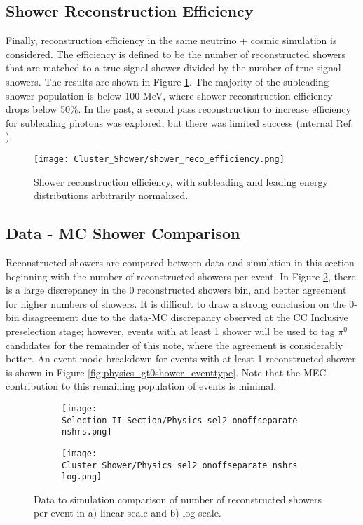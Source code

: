 \clearpage
\subsection{Shower Reconstruction Efficiency}
Finally, reconstruction efficiency in the same neutrino + cosmic simulation is considered.  The efficiency is defined to be the number of reconstructed showers that are matched to a true signal shower divided by the number of true signal showers. The results are shown in Figure \ref{fig:shower_reco_efficiency}.  The majority of the subleading shower population is below 100 MeV, where shower reconstruction efficiency drops below 50\%.  In the past, a second pass reconstruction to increase efficiency for subleading photons was explored, but there was limited success (internal Ref. \cite{bib:jz_catch_subleading}).  

\begin{figure}[h!]
\centering
\texttt{[image: Cluster\_Shower/shower\_reco\_efficiency.png]}
\caption{Shower reconstruction efficiency, with subleading and leading energy distributions arbitrarily normalized.  }
\label{fig:shower_reco_efficiency}
\end{figure}


\subsection{Data - MC Shower Comparison}
Reconstructed showers are compared between data and simulation in this section beginning with the number of reconstructed showers per event.  In Figure \ref{fig:physics_sel2_nshrs}, there is a large discrepancy in the 0 reconstructed showers bin, and better agreement for higher numbers of showers. It is difficult to draw a strong conclusion on the 0-bin disagreement due to the data-MC discrepancy observed at the CC Inclusive preselection stage; however, events with at least 1 shower will be used to tag $\pi^0$ candidates for the remainder of this note, where the agreement is considerably better.  An event mode breakdown for events with at least 1 reconstructed shower is shown in Figure \ref{fig:physics_gt0shower_eventtype}. Note that the MEC contribution to this remaining population of events is minimal.
 
\begin{figure}[H]
  \begin{subfigure}[t]{0.3\textwidth}
\texttt{[image: Selection\_II\_Section/Physics\_sel2\_onoffseparate\_nshrs.png]}
  \caption{ }
  \end{subfigure} 
  \hspace{35 mm}
  \begin{subfigure}[t]{0.3\textwidth}
\texttt{[image: Cluster\_Shower/Physics\_sel2\_onoffseparate\_nshrs\_log.png]}
  \caption{ }
  \end{subfigure} 
\caption{ Data to simulation comparison of number of reconstructed showers per event in a) linear scale and b) log scale. }
\label{fig:physics_sel2_nshrs}
\end{figure}

